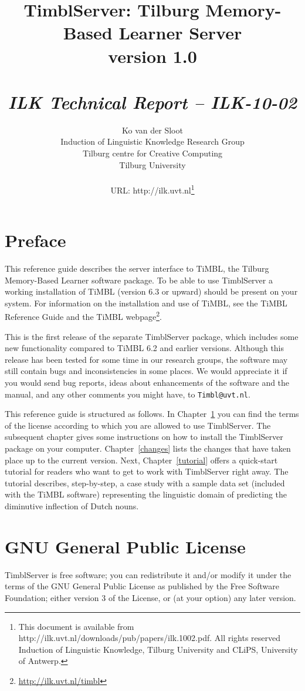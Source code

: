 \documentclass{report}
\author{Ko van der Sloot \\
	Induction of Linguistic Knowledge Research Group\\
	Tilburg centre for Creative Computing\\
        Tilburg University \\ \\
       URL: http://ilk.uvt.nl\thanks{This document is available from
	http://ilk.uvt.nl/downloads/pub/papers/ilk.1002.pdf. All rights reserved
	Induction of Linguistic Knowledge, Tilburg University and 
        CLiPS, University of Antwerp.}}
\title{{\huge TimblServer: Tilburg Memory-Based Learner Server} \\ \vspace*{0.5cm}
{\bf version 1.0} \\ \vspace*{0.5cm}{\huge Manual}\\
\vspace*{1cm} {\it ILK Technical Report -- ILK-10-02}}
\begin{document}

\maketitle

\tableofcontents

\chapter*{Preface}

This reference guide describes the server interface to TiMBL, the
Tilburg Memory-Based Learner software package. To be able to use
TimblServer a working installation of TiMBL (version 6.3 or upward)
should be present on your system. For information on the installation
and use of TiMBL, see the TiMBL Reference Guide \cite{Daelemans+10}
and the TiMBL webpage\footnote{\url{http://ilk.uvt.nl/timbl}}.

This is the first release of the separate TimblServer package, which
includes some new functionality compared to TiMBL 6.2 and earlier
versions.  Although this release has been tested for some time in our
research groups, the software may still contain bugs and
inconsistencies in some places. We would appreciate it if you would
send bug reports, ideas about enhancements of the software and the
manual, and any other comments you might have, to {\tt Timbl@uvt.nl}.

This reference guide is structured as follows. In
Chapter~\ref{license} you can find the terms of the license according
to which you are allowed to use TimblServer. The subsequent chapter gives
some instructions on how to install the TimblServer package on your
computer. Chapter~\ref{changes} lists the changes that have taken
place up to the current version. Next, Chapter~\ref{tutorial} offers a
quick-start tutorial for readers who want to get to work with TimblServer
right away. The tutorial describes, step-by-step, a case study with a
sample data set (included with the TiMBL software) representing the
linguistic domain of predicting the diminutive inflection of Dutch
nouns. 

\chapter{GNU General Public License}
\label{license}

TimblServer is free software; you can redistribute it and/or modify it under the terms of the GNU General Public License as published by the Free Software Foundation; either version 3 of the License, or (at your option) any later version.
\end{document}
